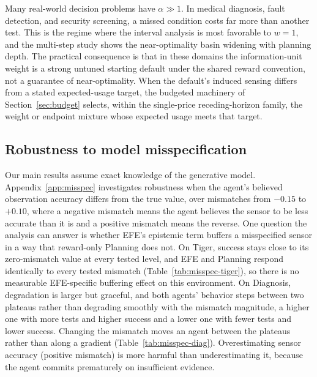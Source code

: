 Many real-world decision problems have $\alpha \gg 1$. In medical diagnosis, fault detection, and security screening, a missed condition costs far more than another test. This is the regime where the interval analysis is most favorable to $w{=}1$, and the multi-step study shows the near-optimality basin widening with planning depth. The practical consequence is that in these domains the information-unit weight is a strong untuned starting default under the shared reward convention, not a guarantee of near-optimality. When the default's induced sensing differs from a stated expected-usage target, the budgeted machinery of Section~\ref{sec:budget} selects, within the single-price receding-horizon family, the weight or endpoint mixture whose expected usage meets that target.

\subsection{Robustness to model misspecification}
Our main results assume exact knowledge of the generative model. Appendix~\ref{app:misspec} investigates robustness when the agent's believed observation accuracy differs from the true value, over mismatches from $-0.15$ to $+0.10$, where a negative mismatch means the agent believes the sensor to be less accurate than it is and a positive mismatch means the reverse. One question the analysis can answer is whether EFE's epistemic term buffers a misspecified sensor in a way that reward-only Planning does not. On Tiger, success stays close to its zero-mismatch value at every tested level, and EFE and Planning respond identically to every tested mismatch (Table~\ref{tab:misspec-tiger}), so there is no measurable EFE-specific buffering effect on this environment. On Diagnosis, degradation is larger but graceful, and both agents' behavior steps between two plateaus rather than degrading smoothly with the mismatch magnitude, a higher one with more tests and higher success and a lower one with fewer tests and lower success. Changing the mismatch moves an agent between the plateaus rather than along a gradient (Table~\ref{tab:misspec-diag}). Overestimating sensor accuracy (positive mismatch) is more harmful than underestimating it, because the agent commits prematurely on insufficient evidence.

